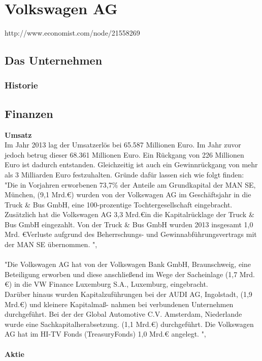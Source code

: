 \documentclass[12pt]{article}
\begin{document}
\section{Volkswagen AG}
http://www.economist.com/node/21558269
\subsection{Das Unternehmen}
\subsubsection{Historie}

\subsection{Finanzen}
\textbf{Umsatz}\\
Im Jahr 2013 lag der Umsatzerlös bei 65.587 Millionen Euro. Im Jahr zuvor jedoch betrug dieser 68.361 Millionen Euro. Ein Rückgang von 226 Millionen Euro ist dadurch entstanden. Gleichzeitig ist auch ein Gewinnrückgang von mehr als 3 Milliarden Euro festzuhalten. Gründe dafür lassen sich wie folgt finden:
\\
"Die in Vorjahren erworbenen 73,7\% der Anteile am Grundkapital der MAN SE, München, (9,1 Mrd.\euro) wurden von
der Volkswagen AG im Geschäftsjahr in die Truck \& Bus GmbH, eine 100-prozentige Tochtergesellschaft eingebracht.
Zusätzlich hat die Volkswagen AG 3,3 Mrd.\euro in die Kapitalrücklage der Truck \& Bus GmbH eingezahlt. Von der Truck \&
Bus GmbH wurden 2013 insgesamt 1,0 Mrd. \euro Verluste aufgrund des Beherrschungs- und Gewinnabführungsvertrags
mit der MAN SE übernommen. ",\cite[Seite 3]{jbilanz2013vw}
\\\\
"Die Volkswagen AG hat von der Volkswagen Bank GmbH, Braunschweig, eine Beteiligung erworben und diese anschließend im Wege der Sacheinlage (1,7 Mrd.\euro) in die VW Finance Luxemburg S.A., Luxemburg, eingebracht.\\
Darüber hinaus wurden Kapitalzuführungen bei der AUDI AG, Ingolstadt, (1,9 Mrd.\euro) und kleinere Kapitalmaß-
nahmen bei verbundenen Unternehmen durchgeführt. Bei der der Global Automotive C.V. Amsterdam, Niederlande
wurde eine Sachkapitalherabsetzung. (1,1 Mrd.\euro) durchgeführt. Die Volkswagen AG hat im HI-TV Fonds (TreasuryFonds) 1,0 Mrd.€ angelegt. ",\cite[Seite 4]{jbilanz2013vw}
\\ \\ 
\textbf{Aktie} \\
\end{document}
